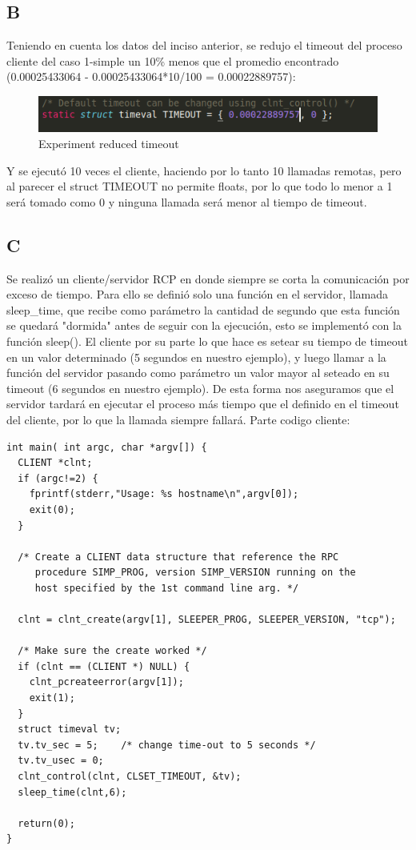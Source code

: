 \documentclass[12pt,journal,compsoc]{IEEEtran}
\begin{document}
\subsection{B}
Teniendo en cuenta los datos del inciso anterior, se redujo el timeout del proceso cliente del caso 1-simple un 10\% menos que el promedio encontrado (0.00025433064 - 0.00025433064*10/100 = 0.00022889757):

\label{reduced-timeout}
\begin{figure}[H]
\centering
\includegraphics[width=125mm]{capturas/reduced-timeout.png}
\caption{Experiment reduced timeout\label{Reduced timeout}}
\end{figure}

Y se ejecutó 10 veces el cliente, haciendo por lo tanto 10 llamadas remotas, pero al parecer el struct TIMEOUT no permite floats, por lo que todo lo menor a 1 será tomado como 0 y ninguna llamada será menor al tiempo de timeout.

\subsection{C}
Se realizó un cliente/servidor RCP en donde siempre se corta la comunicación por exceso de tiempo. Para ello se definió solo una función en el servidor, llamada sleep\_time, que recibe como parámetro la cantidad de segundo que esta función se quedará "dormida" antes de seguir con la ejecución, esto se implementó con la función sleep(). El cliente por su parte lo que hace es setear su tiempo de timeout en un valor determinado (5 segundos en nuestro ejemplo), y luego llamar a la función del servidor pasando como parámetro un valor mayor al seteado en su timeout (6 segundos en nuestro ejemplo). De esta forma nos aseguramos que el servidor tardará en ejecutar el proceso más tiempo que el definido en el timeout del cliente, por lo que la llamada siempre fallará.
Parte codigo cliente:
\begin{lstlisting}
int main( int argc, char *argv[]) {
  CLIENT *clnt;
  if (argc!=2) {
    fprintf(stderr,"Usage: %s hostname\n",argv[0]);
    exit(0);
  }

  /* Create a CLIENT data structure that reference the RPC
     procedure SIMP_PROG, version SIMP_VERSION running on the
     host specified by the 1st command line arg. */

  clnt = clnt_create(argv[1], SLEEPER_PROG, SLEEPER_VERSION, "tcp");

  /* Make sure the create worked */
  if (clnt == (CLIENT *) NULL) {
    clnt_pcreateerror(argv[1]);
    exit(1);
  }
  struct timeval tv;
  tv.tv_sec = 5;    /* change time-out to 5 seconds */
  tv.tv_usec = 0;
  clnt_control(clnt, CLSET_TIMEOUT, &tv);
  sleep_time(clnt,6);

  return(0);
}
\end{lstlisting}
\end{document}
